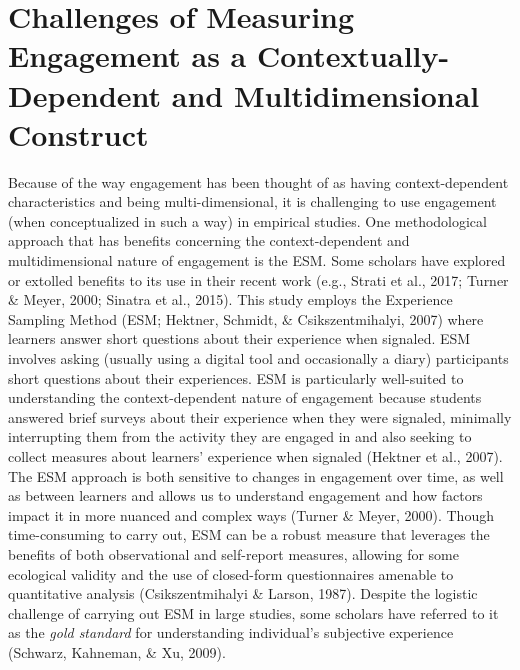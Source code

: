 \documentclass[]{book}
\theoremstyle{definition}
\theoremstyle{definition}
\theoremstyle{definition}
\theoremstyle{remark}
\begin{document}
\section{Challenges of Measuring Engagement as a Contextually-Dependent
and Multidimensional
Construct}\label{challenges-of-measuring-engagement-as-a-contextually-dependent-and-multidimensional-construct}

Because of the way engagement has been thought of as having
context-dependent characteristics and being multi-dimensional, it is
challenging to use engagement (when conceptualized in such a way) in
empirical studies. One methodological approach that has benefits
concerning the context-dependent and multidimensional nature of
engagement is the ESM. Some scholars have explored or extolled benefits
to its use in their recent work (e.g., Strati et al., 2017; Turner \&
Meyer, 2000; Sinatra et al., 2015). This study employs the Experience
Sampling Method (ESM; Hektner, Schmidt, \& Csikszentmihalyi, 2007) where
learners answer short questions about their experience when signaled.
ESM involves asking (usually using a digital tool and occasionally a
diary) participants short questions about their experiences. ESM is
particularly well-suited to understanding the context-dependent nature
of engagement because students answered brief surveys about their
experience when they were signaled, minimally interrupting them from the
activity they are engaged in and also seeking to collect measures about
learners' experience when signaled (Hektner et al., 2007). The ESM
approach is both sensitive to changes in engagement over time, as well
as between learners and allows us to understand engagement and how
factors impact it in more nuanced and complex ways (Turner \& Meyer,
2000). Though time-consuming to carry out, ESM can be a robust measure
that leverages the benefits of both observational and self-report
measures, allowing for some ecological validity and the use of
closed-form questionnaires amenable to quantitative analysis
(Csikszentmihalyi \& Larson, 1987). Despite the logistic challenge of
carrying out ESM in large studies, some scholars have referred to it as
the \emph{gold standard} for understanding individual's subjective
experience (Schwarz, Kahneman, \& Xu, 2009).
\end{document}
